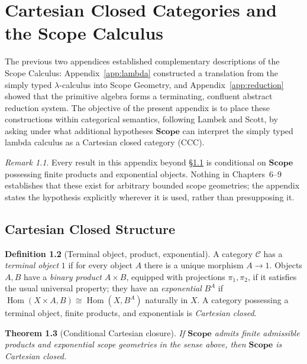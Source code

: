 \documentclass[11pt,twoside,openright]{book}
\numberwithin{equation}{chapter}
\theoremstyle{definition}
\newtheorem{definition}{Definition}[chapter]
\theoremstyle{plain}
\newtheorem{theorem}[definition]{Theorem}
\theoremstyle{remark}
\newtheorem{remark}[definition]{Remark}
\theoremstyle{definition}
\newcommand{\CatScope}{\mathbf{Scope}}
\DeclareMathOperator{\Hom}{Hom}
\begin{document}
\chapter{Cartesian Closed Categories and the Scope Calculus}
\label{app:ccc}

The previous two appendices established complementary descriptions of the
Scope Calculus: Appendix~\ref{app:lambda} constructed a translation from
the simply typed $\lambda$-calculus into Scope Geometry, and
Appendix~\ref{app:reduction} showed that the primitive algebra forms a
terminating, confluent abstract reduction system. The objective of the
present appendix is to place these constructions within categorical
semantics, following Lambek and Scott, by asking under what additional
hypotheses $\CatScope$ can interpret the simply typed lambda calculus as
a Cartesian closed category (CCC).

\begin{remark}
Every result in this appendix beyond \S\ref{sec:app-ccc-def} is
conditional on $\CatScope$ possessing finite products and exponential
objects. Nothing in Chapters~6--9 establishes that these exist for
arbitrary bounded scope geometries; the appendix states the hypothesis
explicitly wherever it is used, rather than presupposing it.
\end{remark}

\section{Cartesian Closed Structure}
\label{sec:app-ccc-def}

\begin{definition}[Terminal object, product, exponential]
A category $\mathcal{C}$ has a \emph{terminal object} $1$ if for every
object $A$ there is a unique morphism $A\to1$. Objects $A,B$ have a
\emph{binary product} $A\times B$, equipped with projections
$\pi_1,\pi_2$, if it satisfies the usual universal property; they have an
\emph{exponential} $B^A$ if $\Hom(X\times A,B)\cong\Hom(X,B^A)$ naturally
in $X$. A category possessing a terminal object, finite products, and
exponentials is \emph{Cartesian closed}.
\end{definition}

\begin{theorem}[Conditional Cartesian closure]
If $\CatScope$ admits finite admissible products and exponential scope
geometries in the sense above, then $\CatScope$ is Cartesian closed.
\end{theorem}
\end{document}
